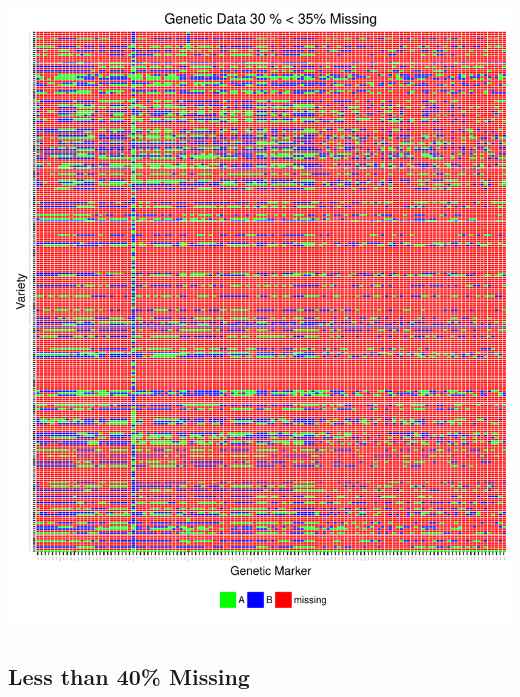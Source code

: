 \documentclass[11pt]{article}\usepackage[]{graphicx}\usepackage[]{color}
\makeatletter
\def\maxwidth{ %
  \ifdim\Gin@nat@width>\linewidth
    \linewidth
  \else
    \Gin@nat@width
  \fi
}
\newenvironment{knitrout}{}{} %
\makeatother
\begin{document}
\begin{knitrout}\footnotesize
{}\color{fgcolor}

{\centering \includegraphics[width=\maxwidth]{figure/missing_plot35-1} 

}



\end{knitrout}

\subsection{Less than 40\% Missing}
\end{document}
